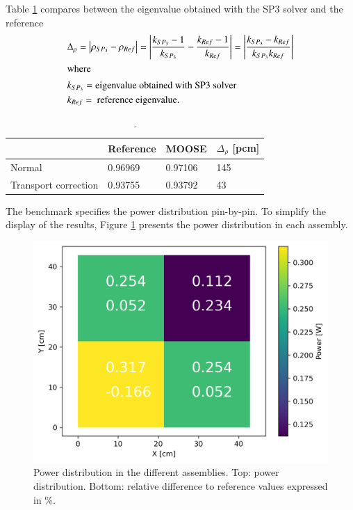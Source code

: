 \documentclass{anstrans}
\begin{document}
Table \ref{tab:keff} compares between the eigenvalue obtained with the SP3 solver and the reference
\begin{align}
  & \Delta_\rho = \left| \rho_{SP_3} - \rho_{Ref} \right| = \left| \frac{k_{SP_3}-1}{k_{SP_3}} - \frac{k_{Ref}-1}{k_{Ref}} \right| = \left| \frac{k_{SP_3}-k_{Ref}}{k_{SP_3} k_{Ref}} \right| \label{eq:delta-rho} \\
  \intertext{where}
  & k_{SP_3} = \mbox{eigenvalue obtained with SP3 solver} \notag \\
  & k_{Ref} = \mbox{ reference eigenvalue.} \notag
\end{align}

\begin{table}[]
	\centering
	\caption{.}
	\label{tab:keff}
	\begin{tabular}{llll}
	\toprule
							& Reference & MOOSE 	& $\Delta_{\rho}$ [pcm]	\\
	\midrule
	Normal 					& 0.96969	& 0.97106	& 145					\\
	Transport correction 	& 0.93755	& 0.93792	& 43					\\
	\bottomrule
	\end{tabular}
\end{table}

The benchmark specifies the power distribution pin-by-pin.
To simplify the display of the results, Figure \ref{fig:power-distrib} presents the power distribution in each assembly.

\begin{figure}[htbp!] %
    \centering
    \includegraphics[width=0.95\linewidth]{figures/distrib.png}
    \hfill
    \caption{Power distribution in the different assemblies. Top: power distribution. Bottom: relative difference to reference values expressed in \%.}
    \label{fig:power-distrib}
\end{figure}
\end{document}

